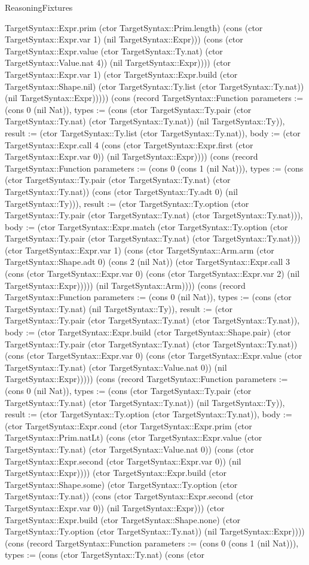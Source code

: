 \begin{lexlean}{ReasoningFixtures}
\begin{semanticmodule}
{TargetSyntax::Expr.prim (ctor TargetSyntax::Prim.length) (cons (ctor TargetSyntax::Expr.var 1) (nil TargetSyntax::Expr))) (cons (ctor TargetSyntax::Expr.value (ctor TargetSyntax::Ty.nat) (ctor TargetSyntax::Value.nat 4)) (nil TargetSyntax::Expr)))) (ctor TargetSyntax::Expr.var 1) (ctor TargetSyntax::Expr.build (ctor TargetSyntax::Shape.nil) (ctor TargetSyntax::Ty.list (ctor TargetSyntax::Ty.nat)) (nil TargetSyntax::Expr))))}) (cons (record TargetSyntax::Function {parameters := (cons 0 (nil Nat)), types := (cons (ctor TargetSyntax::Ty.pair (ctor TargetSyntax::Ty.nat) (ctor TargetSyntax::Ty.nat)) (nil TargetSyntax::Ty)), result := (ctor TargetSyntax::Ty.list (ctor TargetSyntax::Ty.nat)), body := (ctor TargetSyntax::Expr.call 4 (cons (ctor TargetSyntax::Expr.first (ctor TargetSyntax::Expr.var 0)) (nil TargetSyntax::Expr)))}) (cons (record TargetSyntax::Function {parameters := (cons 0 (cons 1 (nil Nat))), types := (cons (ctor TargetSyntax::Ty.pair (ctor TargetSyntax::Ty.nat) (ctor TargetSyntax::Ty.nat)) (cons (ctor TargetSyntax::Ty.adt 0) (nil TargetSyntax::Ty))), result := (ctor TargetSyntax::Ty.option (ctor TargetSyntax::Ty.pair (ctor TargetSyntax::Ty.nat) (ctor TargetSyntax::Ty.nat))), body := (ctor TargetSyntax::Expr.match (ctor TargetSyntax::Ty.option (ctor TargetSyntax::Ty.pair (ctor TargetSyntax::Ty.nat) (ctor TargetSyntax::Ty.nat))) (ctor TargetSyntax::Expr.var 1) (cons (ctor TargetSyntax::Arm.arm (ctor TargetSyntax::Shape.adt 0) (cons 2 (nil Nat)) (ctor TargetSyntax::Expr.call 3 (cons (ctor TargetSyntax::Expr.var 0) (cons (ctor TargetSyntax::Expr.var 2) (nil TargetSyntax::Expr))))) (nil TargetSyntax::Arm)))}) (cons (record TargetSyntax::Function {parameters := (cons 0 (nil Nat)), types := (cons (ctor TargetSyntax::Ty.nat) (nil TargetSyntax::Ty)), result := (ctor TargetSyntax::Ty.pair (ctor TargetSyntax::Ty.nat) (ctor TargetSyntax::Ty.nat)), body := (ctor TargetSyntax::Expr.build (ctor TargetSyntax::Shape.pair) (ctor TargetSyntax::Ty.pair (ctor TargetSyntax::Ty.nat) (ctor TargetSyntax::Ty.nat)) (cons (ctor TargetSyntax::Expr.var 0) (cons (ctor TargetSyntax::Expr.value (ctor TargetSyntax::Ty.nat) (ctor TargetSyntax::Value.nat 0)) (nil TargetSyntax::Expr))))}) (cons (record TargetSyntax::Function {parameters := (cons 0 (nil Nat)), types := (cons (ctor TargetSyntax::Ty.pair (ctor TargetSyntax::Ty.nat) (ctor TargetSyntax::Ty.nat)) (nil TargetSyntax::Ty)), result := (ctor TargetSyntax::Ty.option (ctor TargetSyntax::Ty.nat)), body := (ctor TargetSyntax::Expr.cond (ctor TargetSyntax::Expr.prim (ctor TargetSyntax::Prim.natLt) (cons (ctor TargetSyntax::Expr.value (ctor TargetSyntax::Ty.nat) (ctor TargetSyntax::Value.nat 0)) (cons (ctor TargetSyntax::Expr.second (ctor TargetSyntax::Expr.var 0)) (nil TargetSyntax::Expr)))) (ctor TargetSyntax::Expr.build (ctor TargetSyntax::Shape.some) (ctor TargetSyntax::Ty.option (ctor TargetSyntax::Ty.nat)) (cons (ctor TargetSyntax::Expr.second (ctor TargetSyntax::Expr.var 0)) (nil TargetSyntax::Expr))) (ctor TargetSyntax::Expr.build (ctor TargetSyntax::Shape.none) (ctor TargetSyntax::Ty.option (ctor TargetSyntax::Ty.nat)) (nil TargetSyntax::Expr)))}) (cons (record TargetSyntax::Function {parameters := (cons 0 (cons 1 (nil Nat))), types := (cons (ctor TargetSyntax::Ty.nat) (cons (ctor }
\end{semanticmodule}
\end{lexlean}
